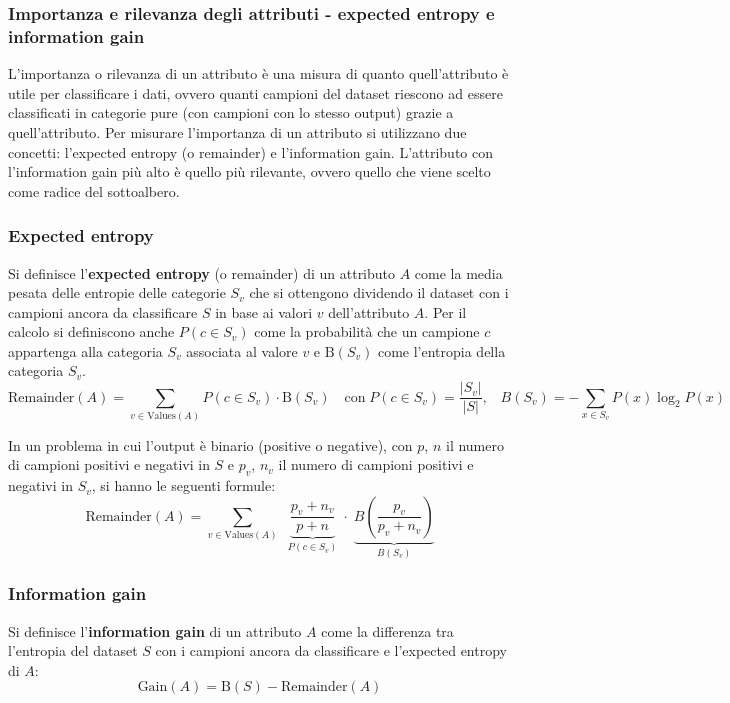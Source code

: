\newpage

\subsubsection*{Importanza e rilevanza degli attributi - expected entropy e information gain}
L'importanza o rilevanza di un attributo è una misura di quanto quell'attributo è utile per classificare i dati, ovvero quanti
campioni del dataset riescono ad essere classificati in categorie pure (con campioni con lo stesso output) grazie a quell'attributo.
Per misurare l'importanza di un attributo si utilizzano due concetti: l'expected entropy (o remainder) e l'information gain.
L'attributo con l'information gain più alto è quello più rilevante, ovvero quello che viene scelto come radice del sottoalbero.

\subsubsection*{Expected entropy}
Si definisce l'\textbf{expected entropy} (o remainder) di un attributo \(A\) come la media pesata delle entropie delle categorie
\(S_v\) che si ottengono dividendo il dataset con i campioni ancora da classificare \(S\) in base ai valori \(v\) dell'attributo
\(A\). Per il calcolo si definiscono anche \(P(c \in S_v)\) come la probabilità che un campione \(c\) appartenga alla categoria
\(S_v\) associata al valore \(v\) e \(\text{B}(S_v)\) come l'entropia della categoria \(S_v\).
\[\text{Remainder}(A) = \sum_{v \in \text{Values}(A)} P(c \in S_v) \cdot \text{B}(S_v) \quad \text{con} \; P(c \in S_v) = \frac{|S_v|}{|S|}, \;\;\; B(S_v) = -\sum_{x \in S_v} P(x) \log_2 P(x)\]

In un problema in cui l'output è binario (positive o negative), con \(p\), \(n\) il numero di campioni positivi e negativi in
\(S\) e \(p_v\), \(n_v\) il numero di campioni positivi e negativi in \(S_v\), si hanno le seguenti formule:
\[\text{Remainder}(A) = \sum_{v \in \text{Values}(A)} \;\; \underbrace{\frac{p_v + n_v}{p + n}}_{P(c \in S_v)} \; \cdot \; \underbrace{B\left(\frac{p_v}{p_v+n_v} \right)}_{B(S_v)}\]

\subsubsection*{Information gain}
Si definisce l'\textbf{information gain} di un attributo \(A\) come la differenza tra l'entropia del dataset \(S\) con i campioni
ancora da classificare e l'expected entropy di \(A\):
\[\text{Gain}(A) = \text{B}(S) - \text{Remainder}(A)\]

